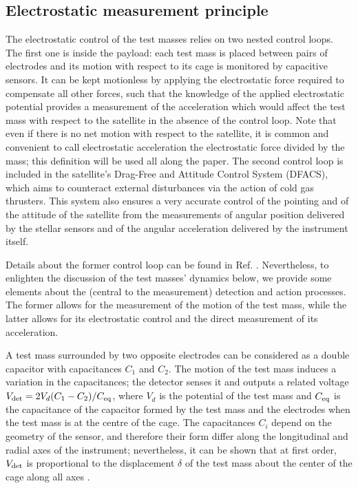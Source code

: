 \documentclass[12pt]{iopart}
\begin{document}
\subsection{Electrostatic measurement principle}

The electrostatic control of the test masses relies on two nested control loops. 
The first one is inside the payload: each test mass is placed between pairs of electrodes and its motion with respect to its cage is monitored by capacitive sensors. It can be kept motionless by applying the electrostatic force required to compensate all other forces, such that the knowledge of the applied electrostatic potential provides a measurement of the acceleration which would affect the test mass with respect to the satellite in the absence of the control loop. Note that even if there is no net motion with respect to the satellite, it is common and convenient to call electrostatic acceleration the electrostatic force divided by the mass; this definition will be used all along the paper.
The second control loop is included in the satellite's Drag-Free and Attitude Control System (DFACS), which aims to counteract external disturbances via the action of cold gas thrusters. %
This system also ensures a very accurate control of the pointing and of the attitude of the satellite from the measurements of angular position delivered by the stellar sensors and of the angular acceleration delivered by the instrument itself.


Details about the former control loop can be found in Ref. \cite{liorzou20}. Nevertheless, to enlighten the discussion of the test masses' dynamics below, we provide some elements about the (central to the measurement) detection and action processes. The former allows for the measurement of the motion of the test mass, while the latter allows for its electrostatic control and the direct measurement of its acceleration.

A test mass surrounded by two opposite electrodes can be considered as a double capacitor with capacitances $C_1$ and $C_2$. The motion of the test mass induces a variation in the capacitances; the detector senses it and outputs a related voltage $V_{\rm det} = 2V_d (C_1 - C_2) / C_{\rm eq}$, where $V_d$ is the potential of the test mass and $C_{\rm eq}$ is the capacitance of the capacitor formed by the test mass and the electrodes when the test mass is at the centre of the cage.
The capacitances $C_i$ depend on the geometry of the sensor, and therefore their form differ along the longitudinal and radial axes of the instrument; nevertheless, it can be shown that at first order, $V_{\rm det}$ is proportional to the displacement $\delta$ of the test mass about the center of the cage along all axes \cite{liorzou20}.
\end{document}
